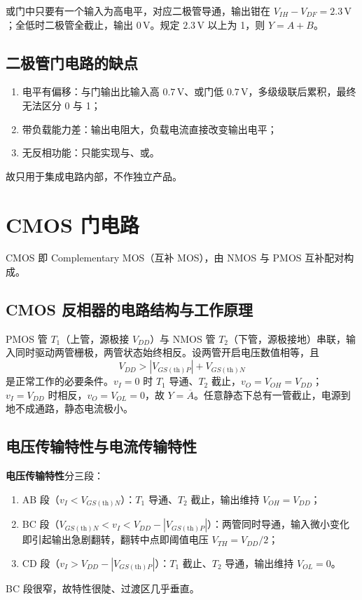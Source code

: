 或门中只要有一个输入为高电平，对应二极管导通，输出钳在 \(V_{IH}-V_{DF}=2.3\,\mathrm{V}\)；全低时二极管全截止，输出 \(0\,\mathrm{V}\)。规定 \(2.3\,\mathrm{V}\) 以上为 1，则 \(Y=A+B\)。

\subsection{二极管门电路的缺点}
\begin{enumerate}
    \item 电平有偏移：与门输出比输入高 \(0.7\,\mathrm{V}\)、或门低 \(0.7\,\mathrm{V}\)，多级级联后累积，最终无法区分 0 与 1；
    \item 带负载能力差：输出电阻大，负载电流直接改变输出电平；
    \item 无反相功能：只能实现与、或。
\end{enumerate}
故只用于集成电路内部，不作独立产品。

\section{CMOS 门电路}
CMOS 即 Complementary MOS（互补 MOS），由 NMOS 与 PMOS 互补配对构成。

\subsection{CMOS 反相器的电路结构与工作原理}
PMOS 管 \(T_1\)（上管，源极接 \(V_{DD}\)）与 NMOS 管 \(T_2\)（下管，源极接地）串联，输入同时驱动两管栅极，两管状态始终相反。设两管开启电压数值相等，且
\[
V_{DD}>\left|V_{GS(\mathrm{th})P}\right|+V_{GS(\mathrm{th})N}
\]
是正常工作的必要条件。\(v_I=0\) 时 \(T_1\) 导通、\(T_2\) 截止，\(v_O=V_{OH}=V_{DD}\)；\(v_I=V_{DD}\) 时相反，\(v_O=V_{OL}=0\)，故 \(Y=\overline{A}\)。任意静态下总有一管截止，电源到地不成通路，静态电流极小。

\subsection{电压传输特性与电流传输特性}
\textbf{电压传输特性}分三段：
\begin{enumerate}
    \item AB 段（\(v_I<V_{GS(\mathrm{th})N}\)）：\(T_1\) 导通、\(T_2\) 截止，输出维持 \(V_{OH}=V_{DD}\)；
    \item BC 段（\(V_{GS(\mathrm{th})N}<v_I<V_{DD}-|V_{GS(\mathrm{th})P}|\)）：两管同时导通，输入微小变化即引起输出急剧翻转，翻转中点即阈值电压 \(V_{TH}=V_{DD}/2\)；
    \item CD 段（\(v_I>V_{DD}-|V_{GS(\mathrm{th})P}|\)）：\(T_1\) 截止、\(T_2\) 导通，输出维持 \(V_{OL}=0\)。
\end{enumerate}
BC 段很窄，故特性很陡、过渡区几乎垂直。

